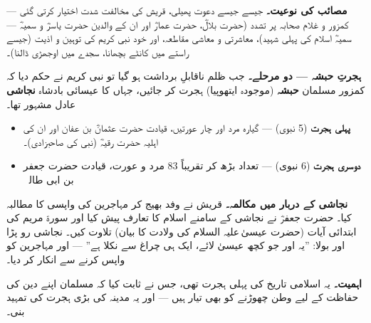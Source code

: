 \begin{hal}
\textbf{مصائب کی نوعیت۔} جیسے جیسے دعوت پھیلی، قریش کی مخالفت شدت اختیار
کرتی گئی --- کمزور و غلام صحابہ پر تشدد (حضرت بلالؓ، حضرت عمارؓ اور ان کے
والدین حضرت یاسرؓ و سمیہؓ --- سمیہؓ اسلام کی پہلی شہید)، معاشرتی و معاشی
مقاطعہ، اور خود نبی کریم \saw کی توہین و اذیت (جیسے راستے میں کانٹے بچھانا،
سجدے میں اوجھڑی ڈالنا)۔

\medskip
\textbf{ہجرتِ حبشہ --- دو مرحلے۔} جب ظلم ناقابلِ برداشت ہو گیا تو نبی کریم
\saw نے حکم دیا کہ کمزور مسلمان \textbf{حبشہ} (موجودہ ایتھوپیا) ہجرت کر
جائیں، جہاں کا عیسائی بادشاہ \textbf{نجاشی} عادل مشہور تھا۔

\begin{itemize}\setlength{\itemsep}{1pt}
  \item \textbf{پہلی ہجرت} (\textenglish{5} نبوی) --- گیارہ مرد اور چار
        عورتیں، قیادت حضرت عثمانؓ بن عفان اور ان کی اہلیہ حضرت رقیہؓ (نبی
        \saw کی صاحبزادی)۔
  \item \textbf{دوسری ہجرت} (\textenglish{6} نبوی) --- تعداد بڑھ کر تقریباً
        \textenglish{83} مرد و عورت، قیادت حضرت جعفر بن ابی طالبؓ۔
\end{itemize}

\medskip
\textbf{نجاشی کے دربار میں مکالمہ۔} قریش نے وفد بھیج کر مہاجرین کی واپسی کا
مطالبہ کیا۔ حضرت جعفرؓ نے نجاشی کے سامنے اسلام کا تعارف پیش کیا اور سورۃ
مریم کی ابتدائی آیات (حضرت عیسیٰ\,علیہ السلام کی ولادت کا بیان) تلاوت کیں۔
نجاشی رو پڑا اور بولا: ''یہ اور جو کچھ عیسیٰ لائے، ایک ہی چراغ سے نکلا ہے''
--- اور مہاجرین کو واپس کرنے سے انکار کر دیا۔

\medskip
\textbf{اہمیت۔} یہ اسلامی تاریخ کی پہلی ہجرت تھی، جس نے ثابت کیا کہ مسلمان
اپنے دین کی حفاظت کے لیے وطن چھوڑنے کو بھی تیار ہیں --- اور یہ مدینہ کی
بڑی ہجرت کی تمہید بنی۔
\end{hal}
